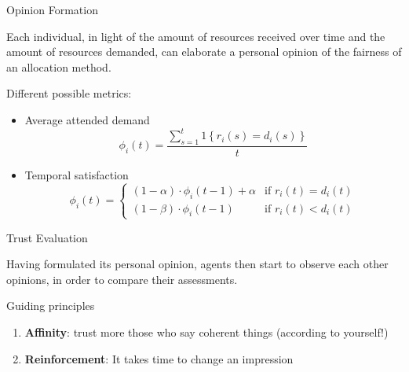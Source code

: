 \begin{frame}{Opinion Formation}

Each individual, in light of the amount of resources received over time
and the amount of resources demanded, can elaborate a personal opinion
of the fairness of an allocation method.

\vspace{0.2cm}

Different possible metrics:

\begin{itemize}
\tightlist
\item
  Average attended demand \[
  \phi_i(t) = \frac{\displaystyle \sum_{s=1}^t 1{\left \{ r_i(s) = d_i(s) \right \}}}{t}
  \]
\item
  Temporal satisfaction \[
  \phi_i(t) =
   \begin{cases}
    (1 - \alpha) \cdot \phi_i(t-1) +  \alpha & \text{if } r_i(t) = d_i(t)\\
    (1 - \beta) \cdot \phi_i(t-1)  & \text{if } r_i(t) < d_i(t)
   \end{cases}
  \]
\end{itemize}

\end{frame}

\begin{frame}{Trust Evaluation}

Having formulated its personal opinion, agents then start to observe
each other opinions, in order to compare their assessments.

\begin{block}{Guiding principles}
\begin{enumerate}
\item \textbf{Affinity}: trust more those who say coherent things (according to yourself!)
\item \textbf{Reinforcement}: It takes time to change an impression
\end{enumerate}
\end{block}

\end{frame}

